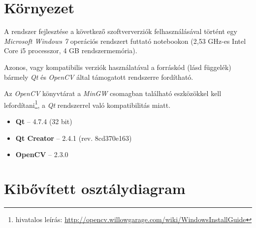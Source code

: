 \section{Környezet}\label{sect:telepites}

A rendszer fejlesztése a következő szoftververziók felhasználásával történt egy \emph{Microsoft Windows 7} operációs rendszert futtató notebookon (2,53 GHz-es Intel Core i5 processzor, 4 GB rendszermemória).

Azonos, vagy kompatibilis verziók használatával a forráskód (lásd  függelék) bármely \emph{Qt} és \emph{OpenCV} által támogatott rendszerre fordítható.

Az \emph{OpenCV} könyvtárat a \emph{MinGW} csomagban található eszközökkel kell lefordítani\footnote{hivatalos leírás: \url{http://opencv.willowgarage.com/wiki/WindowsInstallGuide}}, a \emph{Qt} rendszerrel való kompatibilitás miatt.  

\begin{itemize}
  \item \textbf{Qt} -- 4.7.4 (32 bit)
  \item \textbf{Qt Creator} -- 2.4.1 (rev. 8cd370e163)
  \item \textbf{OpenCV} -- 2.3.0
\end{itemize}

\newpage
\section{Kibővített osztálydiagram}\label{sect:osztalydiagram}

